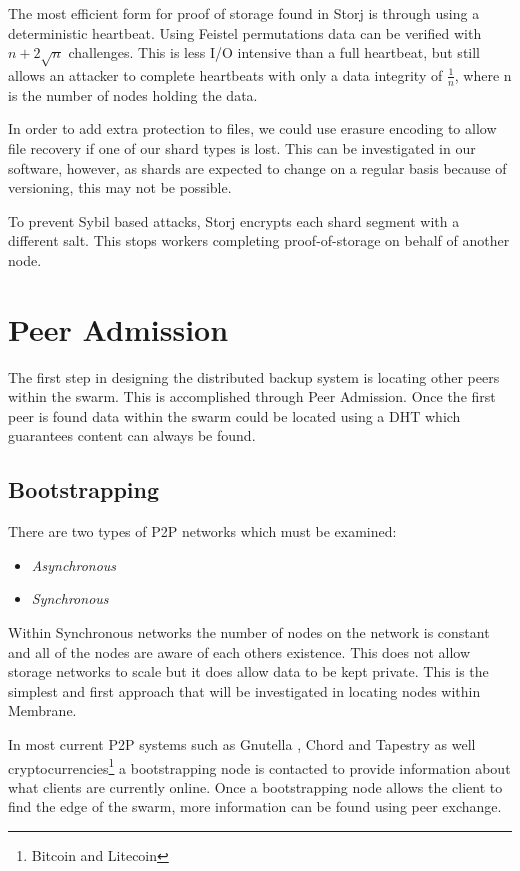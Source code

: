 \documentclass[11pt, a4paper, twocolumn, twoside]{report}
\begin{document}
The most efficient form for proof of storage found in Storj is through using a deterministic heartbeat. Using Feistel permutations data can be verified with $n + 2 \sqrt{n}$ challenges. This is less I/O intensive than a full heartbeat, but still allows an attacker to complete heartbeats with only a data integrity of $\frac{1}{n}$, where n is the number of nodes holding the data.

In order to add extra protection to files, we could use erasure encoding to allow file recovery if one of our shard types is lost. This can be investigated in our software, however, as shards are expected to change on a regular basis because of versioning, this may not be possible.

To prevent Sybil based attacks, Storj encrypts each shard segment with a different salt. This stops workers completing proof-of-storage on behalf of another node.

\section{Peer Admission}

The first step in designing the distributed backup system is locating other peers within the swarm. This is accomplished through Peer Admission. Once the first peer is found data within the swarm could be located using a DHT which guarantees content can always be found.

\subsection{Bootstrapping}

There are two types of P2P networks which must be examined:

\begin{itemize}
 \item \emph{Asynchronous}
 \item \emph{Synchronous}
\end{itemize}

Within Synchronous networks the number of nodes on the network is constant and all of the nodes are aware of each others existence. This does not allow storage networks to scale but it does allow data to be kept private. \citep{saxena2003admission} This is the simplest and first approach that will be investigated in locating nodes within Membrane.

In most current P2P systems such as Gnutella \citep{klingberg2002gnutella}, Chord and Tapestry as well cryptocurrencies\footnote{Bitcoin and Litecoin} a bootstrapping node is contacted to provide information about what clients are currently online. Once a bootstrapping node allows the client to find the edge of the swarm, more information can be found using peer exchange.
\end{document}
